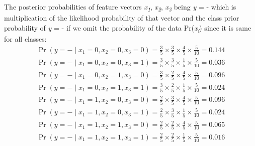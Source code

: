 \documentclass{article}
\DeclareMathOperator{\CondProb}{Pr}
\newcommand{\writex}[2]{{\it{#1\textsubscript#2}}}
\newcommand{\writey}[1]{{\it{#1}}}
\newcommand{\Prob}{Pr}
\begin{document}
The posterior probabilities of feature vectors \writex{x}{1}, \writex{x}{2}, \writex{x}{3} being \writey{y} = - which is multiplication of the likelihood probability of that vector and the class prior probability of \writey{y} = - if we omit the probability of the data \Prob(\writex{x}{i}) since it is same for all classes:
\begin{equation*}
	\begin{aligned}
	\CondProb{(y = -  \mid x_1 = 0, x_2 = 0, x_3 = 0)} = \frac{3}{5}\times\frac{3}{5}\times\frac{4}{5}\times\frac{5}{10} =  0.144 \\
	\CondProb{(y = -  \mid x_1 = 0, x_2 = 0, x_3 = 1)} = \frac{3}{5}\times\frac{3}{5}\times\frac{1}{5}\times\frac{5}{10} = 0.036 \\
	\CondProb{(y = -  \mid x_1 = 0, x_2 = 1, x_3 = 0)} = \frac{3}{5}\times\frac{2}{5}\times\frac{4}{5}\times\frac{5}{10}  = 0.096\\
	\CondProb{(y = -  \mid x_1 = 0, x_2 = 1, x_3 = 1)} = \frac{3}{5}\times\frac{2}{5}\times\frac{1}{5}\times\frac{5}{10}  = 0.024 \\
	\CondProb{(y = -  \mid x_1 = 1, x_2 = 0, x_3 = 0)} = \frac{2}{5}\times\frac{3}{5}\times\frac{4}{5}\times\frac{5}{10} = 0.096 \\
	\CondProb{(y = -  \mid x_1 = 1, x_2 = 0, x_3 = 1)} = \frac{2}{5}\times\frac{3}{5}\times\frac{1}{5}\times\frac{5}{10} = 0.024 \\
	\CondProb{(y = -  \mid x_1 = 1, x_2 = 1, x_3 = 0)} = \frac{2}{5}\times\frac{2}{5}\times\frac{4}{5}\times\frac{5}{10}  = 0.065 \\
	\CondProb{(y = -  \mid x_1 = 1, x_2 = 1, x_3 = 1)} = \frac{2}{5}\times\frac{2}{5}\times\frac{1}{5}\times\frac{5}{10} = 0.016 \\
	\end{aligned}
\end{equation*}
\end{document}
